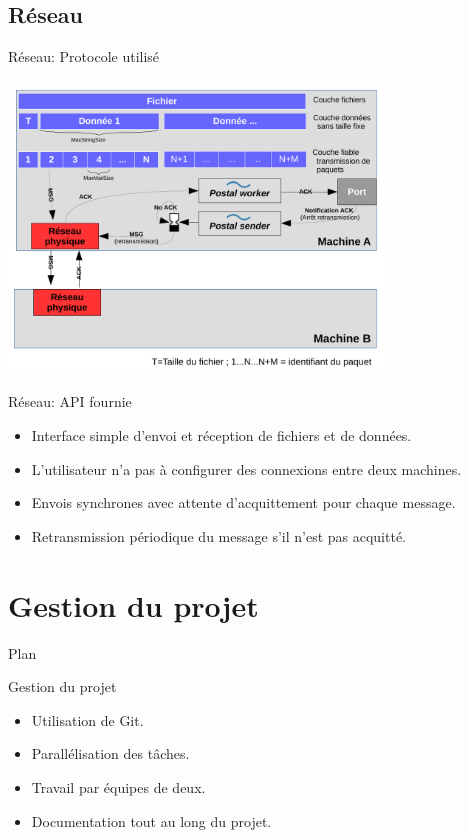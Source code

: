 \documentclass{beamer}
\begin{document}
\subsection{Réseau}

\begin{frame}{Réseau: Protocole utilisé}
        \begin{center}
			\includegraphics[width=10cm]{schema_reseau.pdf}
		\end{center}
\end{frame}

\begin{frame}{Réseau: API fournie}
	\begin{itemize}
        \item Interface simple d'envoi et réception de fichiers et de données.
        \item L'utilisateur n'a pas à configurer des connexions entre deux machines.
        \item Envois synchrones avec attente d'acquittement pour chaque message.
        \item Retransmission périodique du message s'il n'est pas acquitté.
    \end{itemize}
\end{frame}

\section{Gestion du projet}
\begin{frame}{Plan}
    \tableofcontents[currentsection]
\end{frame}

\begin{frame}{Gestion du projet}
    \begin{itemize}
        \item Utilisation de Git.
        \item Parallélisation des tâches.
        \item Travail par équipes de deux.
        \item Documentation tout au long du projet.
    \end{itemize}
\end{frame}
\end{document}
